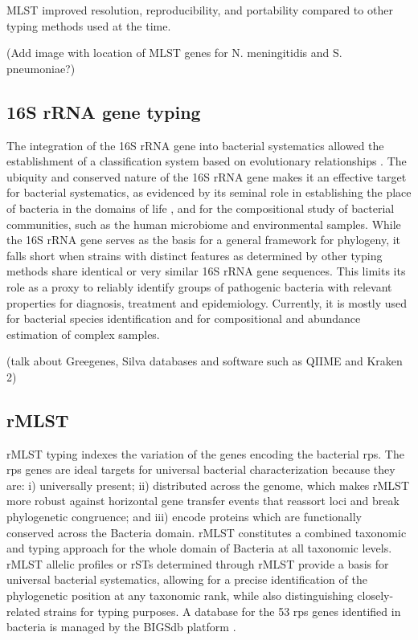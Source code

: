 \ac{MLST} improved resolution, reproducibility, and portability compared to other typing methods used at the time.

(Add image with location of MLST genes for N. meningitidis and S. pneumoniae?)

\subsection{16S rRNA gene typing}

The integration of the 16S \ac{rRNA} gene into bacterial systematics allowed the establishment of a classification system based on evolutionary relationships \cite{jolley_ribosomal_2012, woese_towards_1990}. The ubiquity and conserved nature of the 16S \ac{rRNA} gene makes it an effective target for bacterial systematics, as evidenced by its seminal role in establishing the place of bacteria in the domains of life \cite{woese_bacterial_1987}, and for the compositional study of bacterial communities, such as the human microbiome and environmental samples. While the 16S \ac{rRNA} gene serves as the basis for a general framework for phylogeny, it falls short when strains with distinct features as determined by other typing methods share identical or very similar 16S \ac{rRNA} gene sequences. This limits its role as a proxy to reliably identify groups of pathogenic bacteria with relevant properties for diagnosis, treatment and epidemiology. Currently, it is mostly used for bacterial species identification and for compositional and abundance estimation of complex samples.

(talk about Greegenes, Silva databases and software such as QIIME and Kraken 2)

\subsection{rMLST}

\ac{rMLST} typing indexes the variation of the genes encoding the bacterial \ac{rps}. The \ac{rps} genes are ideal targets for universal bacterial characterization because they are: i) universally present; ii) distributed across the genome, which makes \ac{rMLST} more robust against horizontal gene transfer events that reassort loci and break phylogenetic congruence; and iii) encode proteins which are functionally conserved across the Bacteria domain. \ac{rMLST} constitutes a combined taxonomic and typing approach for the whole domain of Bacteria at all taxonomic levels. \ac{rMLST} allelic profiles or \ac{rSTs} determined through \ac{rMLST} provide a basis for universal bacterial systematics, allowing for a precise identification of the phylogenetic position at any taxonomic rank, while also distinguishing closely-related strains for typing purposes. A database for the 53 \ac{rps} genes identified in bacteria is managed by the \ac{BIGSdb} platform \cite{maiden_mlst_2013}.

